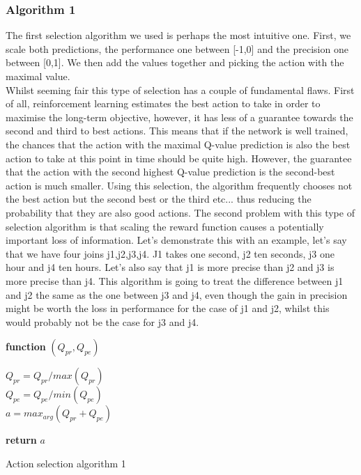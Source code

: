 \subsubsection{Algorithm 1}
The first selection algorithm we used is perhaps the most intuitive one. First, we scale both predictions, the performance one between [-1,0] and the precision one between [0,1]. We then add the values together and picking the action with the maximal value.\\
Whilst seeming fair this type of selection has a couple of fundamental flaws. First of all, reinforcement learning estimates the best action to take in order to maximise the long-term objective, however, it has less of a guarantee towards the second and third to best actions. This means that if the network is well trained, the chances that the action with the maximal Q-value prediction is also the best action to take at this point in time should be quite high. However, the guarantee that the action with the second highest Q-value prediction is the second-best action is much smaller. Using this selection, the algorithm frequently chooses not the best action but the second best or the third etc... thus reducing the probability that they are also good actions. The second problem with this type of selection algorithm is that scaling the reward function causes a potentially important loss of information. Let's demonstrate this with an example, let's say that we have four joins j1,j2,j3,j4. J1 takes one second, j2 ten seconds, j3 one hour and j4 ten hours. Let's also say that j1 is more precise than j2 and j3 is more precise than j4. This algorithm is going to treat the difference between j1 and j2 the same as the one between j3 and j4, even though the gain in precision might be worth the loss in performance for the case of j1 and j2, whilst this would probably not be the case for j3 and j4.
\begin{center}
\begin{algorithm}[H]

    \textbf{function}  $(Q_{pr},Q_{pe})$\;
    
    
    \Indp{}\Indm
    \Indp{} \Indm
    \Indp
    $Q_{pr} = Q_{pr}/max(Q_{pr})$\\
    $Q_{pe} = Q_{pe}/min(Q_{pe})$\\
    $a = max_{arg}(Q_{pr}+Q_{pe})$
    
  
   \textbf{return} $a$

\caption{Action selection algorithm 1}
\end{algorithm}
\end{center}

